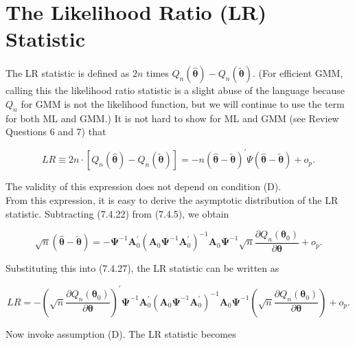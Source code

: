 \documentclass[10pt]{article}
\begin{document}
\section*{The Likelihood Ratio (LR) Statistic}
The LR statistic is defined as $2 n$ times $Q_{n}(\hat{\boldsymbol{\theta}})-Q_{n}(\tilde{\boldsymbol{\theta}})$. (For efficient GMM, calling this the likelihood ratio statistic is a slight abuse of the language because $Q_{n}$ for GMM is not the likelihood function, but we will continue to use the term for both ML and GMM.) It is not hard to show for ML and GMM (see Review Questions 6 and 7) that


\begin{equation*}
L R \equiv 2 n \cdot\left[Q_{n}(\hat{\boldsymbol{\theta}})-Q_{n}(\tilde{\boldsymbol{\theta}})\right]=-n(\hat{\boldsymbol{\theta}}-\tilde{\boldsymbol{\theta}})^{\prime} \Psi(\hat{\boldsymbol{\theta}}-\tilde{\boldsymbol{\theta}})+o_{p} . \tag{7.4.27}
\end{equation*}


The validity of this expression does not depend on condition (D).\\
From this expression, it is easy to derive the asymptotic distribution of the LR statistic. Subtracting (7.4.22) from (7.4.5), we obtain


\begin{equation*}
\sqrt{n}(\hat{\boldsymbol{\theta}}-\tilde{\boldsymbol{\theta}})=-\boldsymbol{\Psi}^{-1} \mathbf{A}_{0}^{\prime}\left(\mathbf{A}_{0} \boldsymbol{\Psi}^{-1} \mathbf{A}_{0}^{\prime}\right)^{-1} \mathbf{A}_{0} \boldsymbol{\Psi}^{-1} \sqrt{n} \frac{\partial Q_{n}\left(\boldsymbol{\theta}_{0}\right)}{\partial \boldsymbol{\theta}}+o_{p} . \tag{7.4.28}
\end{equation*}


Substituting this into (7.4.27), the LR statistic can be written as


\begin{equation*}
L R=-\left(\sqrt{n} \frac{\partial Q_{n}\left(\boldsymbol{\theta}_{0}\right)}{\partial \boldsymbol{\theta}}\right)^{\prime} \boldsymbol{\Psi}^{-1} \mathbf{A}_{0}^{\prime}\left(\mathbf{A}_{0} \boldsymbol{\Psi}^{-1} \mathbf{A}_{0}^{\prime}\right)^{-1} \mathbf{A}_{0} \boldsymbol{\Psi}^{-1}\left(\sqrt{n} \frac{\partial Q_{n}\left(\boldsymbol{\theta}_{0}\right)}{\partial \boldsymbol{\theta}}\right)+o_{p} . \tag{7.4.29}
\end{equation*}


Now invoke assumption (D). The LR statistic becomes
\end{document}
